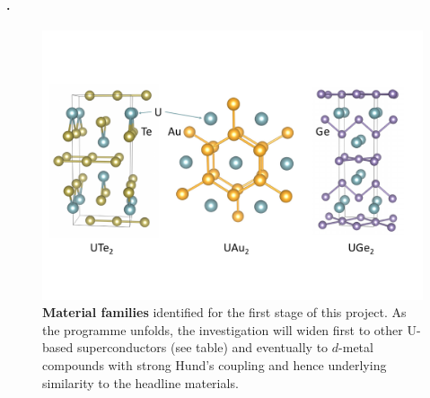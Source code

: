

\paragraph{.} 




\begin{figure}[t]
\centerline{\includegraphics[width=\columnwidth]{Figures/Structures.pdf}}

   \caption{{\bf Material families} identified for the first stage of this project. As the programme unfolds, the investigation will widen first to other U-based superconductors (see table) and eventually to $d$-metal compounds with strong Hund's coupling and hence underlying similarity to the headline materials. }
   
    \label{fig:Materials}
\end{figure}

